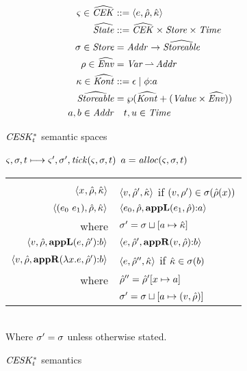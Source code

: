 \begin{figure}
  \centering
  \begin{align*}
    \varsigma \in \widehat{\mathit{CEK}} &::= \langle e, \hat{\rho}, \hat{\kappa} \rangle \\
    \widehat{\mathit{State}} &::= \widehat{\mathit{CEK}} \times \mathit{Store} \times \mathit{Time} \\
    \sigma \in \mathit{Store} &= \mathit{Addr} \to \widehat{\mathit{Storeable}} \\
    \rho \in \widehat{\mathit{Env}} &= \mathit{Var} \operatorname*{\rightharpoonup} \mathit{Addr} \\
    \kappa \in \widehat{\mathit{Kont}} &::= \epsilon \mathrel{\mid} \phi{\tt :} a \\
    \widehat{\mathit{Storeable}} &= \wp(\widehat{\mathit{Kont}} + (\mathit{Value} \times \widehat{\mathit{Env}})) \\
    a,b \in \mathit{Addr} & \quad t,u \in \mathit{Time}
  \end{align*}
  \caption{$\mathit{CESK^*_t}$ semantic spaces}
  \label{fig:ceskstart-spaces}
\end{figure}

\begin{figure}
  \centering
  $\varsigma,\sigma,t \longmapsto \varsigma',\sigma',\mathit{tick}(\varsigma,\sigma,t)$ \quad $a = \mathit{alloc}(\varsigma,\sigma,t)$ \\
  \begin{tabular}{r|l}
    \hline\vspace{-3mm}\\
    $\langle x^{{}}, \hat{\rho}, \hat{\kappa} \rangle$
    &
    $\langle v, \hat{\rho}',\hat{\kappa} \rangle$ if $(v,\rho') \in \sigma(\hat{\rho}(x))$
    \\
    $\langle (e_{0}\ e_{1}){},\hat{\rho},\hat{\kappa} \rangle$
    &
    $\langle e_{0},\hat{\rho},\mathbf{appL}(e_{1},\hat{\rho}){\tt :} a \rangle$ \\
    where & $\sigma' = \sigma\sqcup[a \mapsto \hat{\kappa}]$
    \\
    $\langle v,\hat{\rho}, \mathbf{appL}(e,\hat{\rho}'){\tt :} b \rangle$
    &
    $\langle e,\hat{\rho}',\mathbf{appR}(v,\hat{\rho}){\tt :} b \rangle$
    \\
    $\langle v,\hat{\rho},\mathbf{appR}(\lambda{} x. e,\hat{\rho}'){\tt :} b \rangle$
    &
    $\langle e,\hat{\rho}'',\hat{\kappa} \rangle$ if $\hat{\kappa} \in \sigma(b)$ \\
    where & $\hat{\rho}'' = \hat{\rho}'[x\mapsto a]$ \\
          & $\sigma' = \sigma\sqcup[a \mapsto (v,\hat{\rho})]$
  \end{tabular} \\
  Where $\sigma' = \sigma$ unless otherwise stated.
  \caption{$\mathit{CESK^*_t}$ semantics}
  \label{fig:ceskstart-semantics}
\end{figure}

